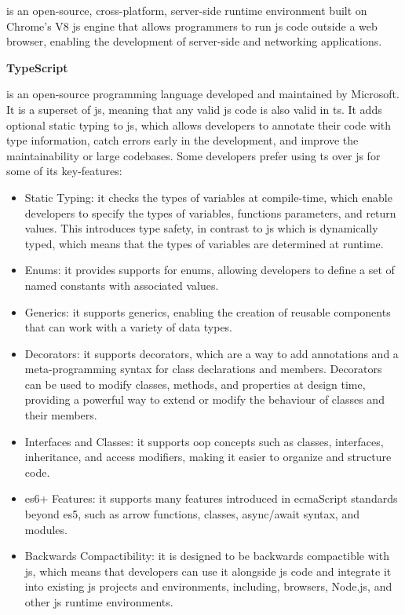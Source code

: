 \begin{multicols}{2}
      is an open-source, cross-platform, server-side runtime environment built on Chrome's V8 \acrshort{js} engine that allows
      programmers to run \acrshort{js} code outside a web browser, enabling the development of server-side and networking applications.

      \textbf{TypeScript}

      is an open-source programming language developed and maintained by Microsoft. It is a superset of \acrshort{js}, meaning that any valid
      \acrshort{js} code is also valid in \acrshort{ts}. It adds optional static typing to \acrshort{js}, which allows developers to
      annotate their code with type information, catch errors early in the development, and improve the maintainability or large codebases. Some
      developers prefer using \acrshort{ts} over \acrshort{js} for some of its key-features:
      \begin{itemize}
            \item Static Typing: it checks the types of variables at compile-time, which enable developers to specify the types of
                  variables, functions parameters, and return values. This introduces type safety, in contrast to \acrshort{js} which is
                  dynamically typed, which means that the types of variables are determined at runtime.
            \item Enums: it provides supports for enums, allowing developers to define a set of named constants with associated values.
            \item Generics: it supports generics, enabling the creation of reusable components that can work with a variety of data types.
            \item Decorators: it supports decorators, which are a way to add annotations and a meta-programming syntax for class
                  declarations and  members. Decorators can be used to modify classes, methods, and properties at design time, providing a
                  powerful way to extend or modify the behaviour of classes and their members.
            \item Interfaces and Classes: it supports \acrshort{oop} concepts such as classes, interfaces, inheritance, and access modifiers,
                  making it easier to organize and structure code.
            \item \acrshort{es}6+ Features: it supports many features introduced in \acrshort{ecma}Script standards beyond \acrshort{es}5,
                  such as arrow functions, classes, async/await syntax, and modules.
            \item Backwards Compactibility: it is designed to be backwards compactible with \acrshort{js}, which means that developers can
                  use it alongside \acrshort{js} code and integrate it into existing \acrshort{js} projects and environments, including,
                  browsers, Node.js, and other \acrshort{js} runtime environments.
      \end{itemize}
\end{multicols}

